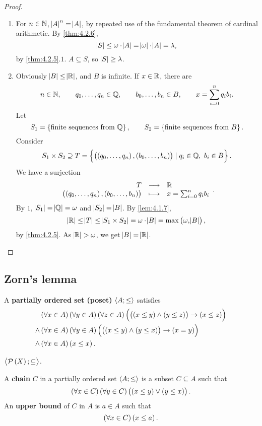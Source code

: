 \begin{proof}
\hfill
\begin{enumerate}
\item For $ n \in \mathbb{N} $, $ \abs{A}^n = \abs{A} $, by repeated use of the fundamental theorem of cardinal arithmetic. By \ref{thm:4.2.6},
$$ \abs{S} \le \omega \cdot \abs{A} = \abs{\omega} \cdot \abs{A} = \lambda, $$
by \ref{thm:4.2.5}.$ 1 $. $ A \subseteq S $, so $ \abs{S} \ge \lambda $.
\item Obviously $ \abs{B} \le \abs{\mathbb{R}} $, and $ B $ is infinite. If $ x \in \mathbb{R} $, there are
$$ n \in \mathbb{N}, \qquad q_0, \dots, q_n \in \mathbb{Q}, \qquad b_0, \dots, b_n \in B, \qquad x = \sum_{i = 0}^n q_ib_i. $$
Let
$$ S_1 = \cbr{\text{finite sequences from} \ \Q}, \qquad S_2 = \cbr{\text{finite sequences from} \ B}. $$
Consider
$$ S_1 \times S_2 \supseteq T = \cbr{\br{\br{q_0, \dots, q_n}, \br{b_0, \dots, b_n}} \mid q_i \in \Q, \ b_i \in B}. $$
We have a surjection
$$ \function{T}{\R}{\br{\br{q_0, \dots, q_n}, \br{b_0, \dots, b_n}}}{x = \sum_{i = 0}^n q_ib_i}. $$
By $ 1 $, $ \abs{S_1} = \abs{\mathbb{Q}} = \omega $ and $ \abs{S_2} = \abs{B} $. By \ref{lem:4.1.7},
$$ \abs{\R} \le \abs{T} \le \abs{S_1 \times S_2} = \omega \cdot \abs{B} = \max\br{\omega, \abs{B}}, $$
by \ref{thm:4.2.5}. As $ \abs{\mathbb{R}} > \omega $, we get $ \abs{B} = \abs{\mathbb{R}} $.
\end{enumerate}
\end{proof}

\pagebreak

\subsection{Zorn's lemma}


A \textbf{partially ordered set (poset)} $ \left\langle A; \le \right\rangle $ satisfies
\begin{align*}
& \fab{x \in A}\fab{y \in A}\fab{z \in A}\impb{\andb{\leb{x}{y}}{\leb{y}{z}}}{\leb{x}{z}} \\
\land & \fab{x \in A}\fab{y \in A}\impb{\andb{\leb{x}{y}}{\leb{y}{x}}}{\eqb{x}{y}} \\
\land & \fab{x \in A}\leb{x}{x}.
\end{align*}

\begin{example*}
$ \abr{\PP\br{X}; \subseteq} $.
\end{example*}

A \textbf{chain} $ C $ in a partially ordered set $ \left\langle A; \le \right\rangle $ is a subset $ C \subseteq A $ such that
$$ \fab{x \in C}\fab{y \in C}\orb{\leb{x}{y}}{\leb{y}{x}}. $$
An \textbf{upper bound} of $ C $ in $ A $ is $ a \in A $ such that
$$ \fab{x \in C}\leb{x}{a}. $$


